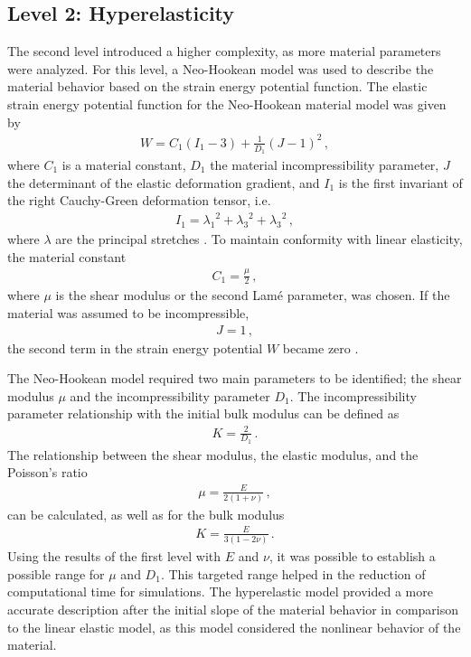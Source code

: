 \subsection{Level 2: Hyperelasticity}
The second level introduced a higher complexity, as more material parameters were analyzed. For this level, a 
Neo-Hookean model was used to describe the material behavior based on the strain energy potential function.
The elastic strain energy potential function for the Neo-Hookean material model was given by
\begin{align}
    W = C_1 (I_1 - 3) + \frac{1}{D_1} (J-1)^2 \, ,
\end{align}
where $C_1$ is a material constant, $D_1$ the material incompressibility parameter, $J$ the determinant 
of the elastic deformation gradient, and $I_1$ is the first invariant of the right Cauchy-Green deformation tensor, i.e. 
\begin{align}
    I_1 = {\lambda_1}^2 + {\lambda_3}^2 + {\lambda_3}^2 \, ,
\end{align} 
where $\lambda$ are the principal stretches \cite{Ogden2013}. To maintain conformity with linear elasticity, the material constant 
\begin{align}
    C_1 = \frac{\mu}{2} \, ,
\end{align}
where $\mu$ is the shear modulus or the second Lamé parameter, was chosen. If the material was assumed to be incompressible,
\begin{align}
    J = 1 \, ,
\end{align} 
the second term in the strain energy potential $W$ became zero \cite{Pence2015}. 

The Neo-Hookean model required two main parameters to be identified; the shear modulus $\mu$ and 
the incompressibility parameter $D_1$. The incompressibility parameter relationship with the initial bulk modulus can be defined \cite{Ansys2010} as
\begin{align}
    K = \frac{2}{D_1} \, .
    \label{eq:incomparcp1}
\end{align}
The relationship between the shear modulus, the elastic modulus, and the Poisson's ratio
\begin{align}
    \mu = \frac{E}{2(1+\nu)} \, ,
    \label{eq:mucp1}
\end{align}
can be calculated, as well as for the bulk modulus 
\begin{align}
    K = \frac{E}{3(1-2\nu)} \, .
    \label{eq:bulkmodcp1}
\end{align}
Using the results of the first level with $E$ and $\nu$, it was possible to establish a possible range for $\mu$ 
and $D_1$. This targeted range helped in the reduction of computational time for simulations.
The hyperelastic model provided a more accurate description after the initial slope of the material behavior in comparison to the linear 
elastic model, as this model considered the nonlinear behavior of the material. 


